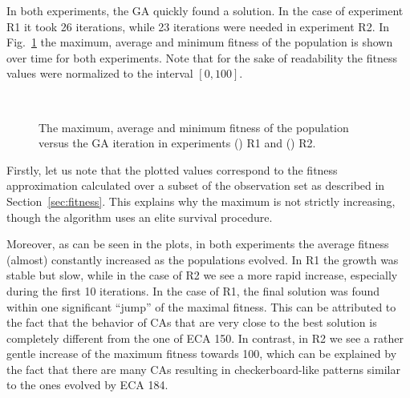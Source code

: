 In both experiments, the GA quickly found a solution. In the case of experiment R1 it took 26 iterations, while 23 iterations were needed in experiment R2. In Fig.~\ref{fig:example-fitness} the maximum, average and minimum fitness of the population is shown over time for both experiments. Note that for the sake of readability the fitness values were normalized to the interval $[0,100]$.

\begin{figure}
	\centering
	\
	\caption{The maximum, average and minimum fitness of the population versus the GA iteration in experiments (\protect{}) R1 and (\protect{}) R2.}\label{fig:example-fitness}
\end{figure}

Firstly, let us note that the plotted values correspond to the fitness approximation calculated over a subset of the observation set as described in Section~\ref{sec:fitness}. This explains why the maximum is not strictly increasing, though the algorithm uses an elite survival procedure.

Moreover, as can be seen in the plots, in both experiments the average fitness (almost) constantly increased as the populations evolved. In R1 the growth was stable but slow, while in the case of R2 we see a more rapid increase, especially during the first 10 iterations. In the case of R1, the final solution was found within one significant ``jump'' of the maximal fitness. This can be attributed to the fact that the behavior of CAs that are very close to the best solution is completely different from the one of ECA 150. In contrast, in R2 we see a rather gentle increase of the maximum fitness towards 100, which can be explained by the fact that there are many CAs resulting in checkerboard-like patterns similar to the ones evolved by ECA 184.

